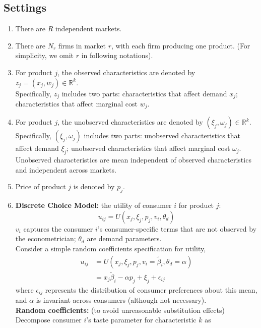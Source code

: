 \documentclass[11pt]{elegantbook}
\begin{document}
\subsection{Settings}
\begin{enumerate}
    \item There are $R$ independent markets.
    \item There are $N_r$ firms in market $r$, with each firm producing one product. (For simplicity, we omit $r$ in following notations).
    \item For product $j$, the observed characteristics are denoted by $z_{j}=(x_j,w_j)\in \mathbb{R}^k$.\\ Specifically, $z_j$ includes two parts:
    \subitem characteristics that affect demand $x_j$;
    \subitem characteristics that affect marginal cost $w_j$.
    \item For product $j$, the unobserved characteristics are denoted by $(\xi_j,\omega_j)\in \mathbb{R}^k$.\\ Specifically, $(\xi_j,\omega_j)$ includes two parts:
    \subitem unobserved characteristics that affect demand $\xi_j$;
    \subitem unobserved characteristics that affect marginal cost $\omega_j$.\\
    Unobserved characteristics are mean independent of observed characteristics and independent across markets.
    \item Price of product $j$ is denoted by $p_j$.
    \item \textbf{Discrete Choice Model:} the utility of consumer $i$ for product $j$: $$u_{ij}=U(x_j,\xi_j,p_j,v_i,\theta_d)$$
    \subitem $v_i$ captures the consumer $i$'s consumer-specific terms that are not observed by the econometrician;
    \subitem $\theta_d$ are demand parameters.\\
    Consider a simple random coefficients specification for utility,
    \begin{equation}
        \begin{aligned}
            u_{ij}&=U(x_j,\xi_j,p_j,v_i=\tilde{\beta}_i,\theta_d=\alpha)\\
            &=x_j\tilde{\beta}_i-\alpha p_j+\xi_j+\epsilon_{ij}
        \end{aligned}
        \tag{(2)}
        \label{(2)}
    \end{equation}
    where $\epsilon_{ij}$ represents the distribution of consumer preferences about this mean, and $\alpha$ is invariant across consumers (although not necessary).\\
    \textbf{Random coefficients:} (to avoid unreasonable substitution effects) Decompose consumer $i$'s taste parameter for characteristic $k$ as

\end{enumerate}
\end{document}
